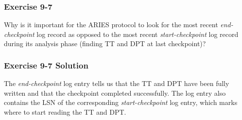 \begin{frame}
\frametitle{Exercise 9-7}
  Why is it important for the ARIES protocol to look for the most recent \textit{end-checkpoint} log record as opposed to the most recent \textit{start-checkpoint} log record during its analysis phase (finding TT and DPT at last checkpoint)?
\end{frame}


\begin{frame}
\frametitle{Exercise 9-7 Solution}
  The \textit{end-checkpoint} log entry tells us that the TT and DPT have been fully written and that the checkpoint completed successfully. The log entry also contains the LSN of the corresponding \textit{start-checkpoint} log entry, which marks where to start reading the TT and DPT.
\end{frame}



